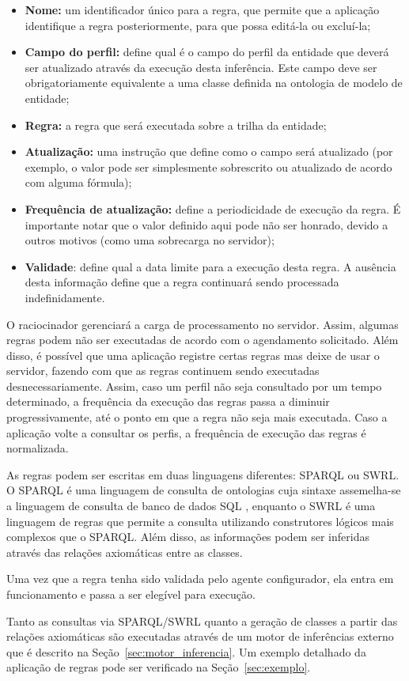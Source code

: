 \begin{itemize}

\item {\bf Nome:} um identificador único para a regra, que permite que a aplicação identifique a regra posteriormente, para que possa editá-la ou excluí-la;

\item {\bf Campo do perfil:} define qual é o campo do perfil da entidade que deverá ser atualizado através da execução desta inferência. Este campo deve ser obrigatoriamente equivalente a uma classe definida na ontologia de modelo de entidade;

\item {\bf Regra:} a regra que será executada sobre a trilha da entidade;

\item {\bf Atualização:} uma instrução que define como o campo será atualizado (por exemplo, o valor pode ser simplesmente sobrescrito ou atualizado de acordo com alguma fórmula);

\item {\bf Frequência de atualização:} define a periodicidade de execução da regra. É importante notar que o valor definido aqui pode não ser honrado, devido a outros motivos (como uma sobrecarga no servidor);

\item {\bf Validade}: define qual a data limite para a execução desta regra. A ausência desta informação define que a regra continuará sendo processada indefinidamente.

\end{itemize}

O raciocinador gerenciará a carga de processamento no servidor. Assim, algumas regras podem não ser executadas de acordo com o agendamento solicitado. Além disso, é possível que uma aplicação registre certas regras mas deixe de usar o servidor, fazendo com que as regras continuem sendo executadas desnecessariamente. Assim, caso um perfil não seja consultado por um tempo determinado, a frequência da execução das regras passa a diminuir progressivamente, até o ponto em que a regra não seja mais executada. Caso a aplicação volte a consultar os perfis, a frequência de execução das regras é normalizada.

As regras podem ser escritas em duas linguagens diferentes: SPARQL ou SWRL. O SPARQL \cite{sparql} é uma linguagem de consulta de ontologias cuja sintaxe assemelha-se a linguagem de consulta de banco de dados SQL \cite{sql}, enquanto o SWRL \cite{swrl} é uma linguagem de regras que permite a consulta utilizando construtores lógicos mais complexos que o SPARQL. Além disso, as informações podem ser inferidas através das relações axiomáticas entre as classes.

Uma vez que a regra tenha sido validada pelo agente configurador, ela entra em funcionamento e passa a ser elegível para execução.

Tanto as consultas via SPARQL/SWRL quanto a geração de classes a partir das relações axiomáticas são executadas através de um motor de inferências externo que é descrito na Seção~\ref{sec:motor_inferencia}. Um exemplo detalhado da aplicação de regras pode ser verificado na Seção~\ref{sec:exemplo}.
